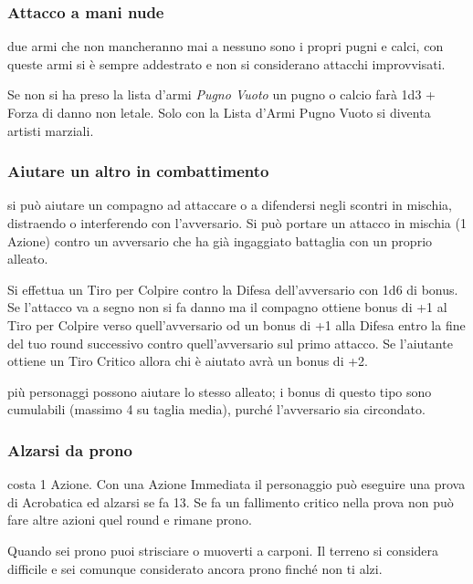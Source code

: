 \begin{multicols}{2}
\subsubsection{Attacco a mani nude}  \label{attaccomaninude}

due armi che non mancheranno mai a nessuno sono i propri pugni e calci, con queste armi si è sempre addestrato e non si considerano attacchi improvvisati.

Se non si ha preso la lista d'armi \emph{Pugno Vuoto} un pugno o calcio farà 1d3 + Forza di danno non letale. Solo con la Lista d'Armi Pugno Vuoto si diventa artisti marziali.

\subsubsection{Aiutare un altro in combattimento}\label{aiutare}\hypertarget{aiutare}{}

si può aiutare un compagno ad attaccare o a difendersi negli scontri in mischia, distraendo o interferendo con l'avversario. Si può portare un attacco in mischia (1 Azione) contro un avversario che ha già ingaggiato battaglia con un proprio alleato.

Si effettua un Tiro per Colpire contro la Difesa dell'avversario con 1d6 di bonus. Se l'attacco va a segno non si fa danno ma il compagno ottiene bonus di +1 al Tiro per Colpire verso quell'avversario od un bonus di +1 alla Difesa entro la fine del tuo round successivo contro quell'avversario sul primo attacco. Se l'aiutante ottiene un Tiro Critico allora chi è aiutato avrà un bonus di +2.

più personaggi possono aiutare lo stesso alleato; i bonus di questo tipo sono cumulabili (massimo 4 su taglia media), purché l'avversario sia circondato.

\subsubsection{Alzarsi da prono}\label{alzarsidaprono}\hypertarget{alzarsidaprono}{}

costa 1 Azione. Con una Azione Immediata il personaggio può eseguire una prova di Acrobatica ed alzarsi se fa 13. Se fa un fallimento critico nella prova non può fare altre azioni quel round e rimane prono.

Quando sei prono puoi strisciare o muoverti a carponi. Il terreno si considera difficile e sei comunque considerato ancora prono finché non ti alzi.


\end{multicols}
